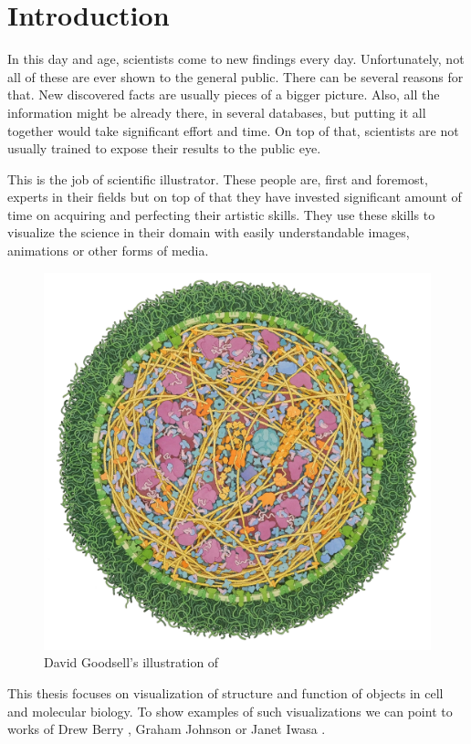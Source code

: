 \documentclass[
  digital, %
  table,   %
  nolof,     %
  nolot,     %
]{fithesis3}
\begin{document}
\chapter{Introduction}
\label{chap:introduction}
In this day and age, scientists come to new findings every day. Unfortunately, not all of these are ever shown to the general public. There can be several reasons for that. New discovered facts are usually pieces of a bigger picture. Also, all the information might be already there, in several databases, but putting it all together would take significant effort and time.
On top of that, scientists are not usually trained to expose their results to the public eye.

This is the job of scientific illustrator. These people are, first and foremost, experts in their fields but on top of that they have invested significant amount of time on acquiring and perfecting their artistic skills. They use these skills to visualize the science in their domain with easily understandable images, animations or other forms of media. %
\begin{figure}
  \centering
  \includegraphics[scale=0.4]{images/goodsell-mycoplasma.jpg}
  \caption{David Goodsell's illustration of}
  \label{fig:goodsell-mycoplasma}
\end{figure}
This thesis focuses on visualization of structure and function of objects in cell and molecular biology. To show examples of such visualizations we can point to works of Drew Berry \cite{DrewBerryMovies}, Graham Johnson \cite{GrahamCellVideo} or Janet Iwasa \cite{iwasa2010animating}.
\end{document}

